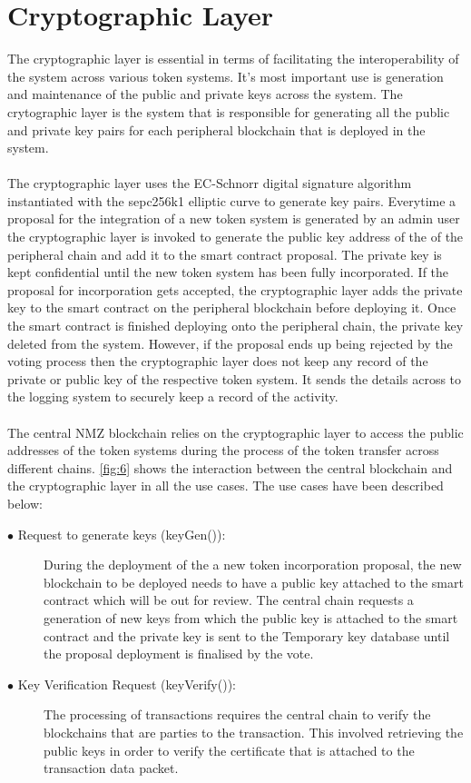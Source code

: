 \documentclass[a4paper,twoside,phd]{BYUPhys}
\begin{document}
\section{Cryptographic Layer}
The cryptographic layer is essential in terms of facilitating the interoperability of the system across various token systems. It's most important use is generation and maintenance of the public and private keys across the system. The crytographic layer is the system that is responsible for generating all the public and private key pairs for each peripheral blockchain that is deployed in the system. 
\\
\\
The cryptographic layer uses the EC-Schnorr digital signature algorithm instantiated with the sepc256k1 elliptic curve to generate key pairs. Everytime a proposal for the integration of a new token system is generated by an admin user the cryptographic layer is invoked to generate the public key address of the of the peripheral chain and add it to the smart contract proposal. The private key is kept confidential until the new token system has been fully incorporated. If the proposal for incorporation gets accepted, the cryptographic layer adds the private key to the smart contract on the peripheral blockchain before deploying it. Once the smart contract is finished deploying onto the peripheral chain, the private key deleted from the system. However, if the proposal ends up being rejected by the voting process then the cryptographic layer does not keep any record of the private or public key of the respective token system. It sends the details across to the logging system to securely keep a record of the activity.
\\
\\
The central NMZ blockchain relies on the cryptographic layer to access the public addresses of the token systems during the process of the token transfer across different chains. \ref{fig:6} shows the interaction between the central blockchain and the cryptographic layer in all the use cases. The use cases have been described below:
\begin{description}
    \item[$\bullet$ Request to generate keys (keyGen()):] During the deployment of the a new token incorporation proposal, the new blockchain to be deployed needs to have a public key attached to the smart contract which will be out for review. The central chain requests a generation of new keys from which the public key is attached to the smart contract and the private key is sent to the Temporary key database until the proposal deployment is finalised by the vote.
    \item[$\bullet$ Key Verification Request (keyVerify()):] The processing of transactions requires the central chain to verify the blockchains that are parties to the transaction. This involved retrieving the public keys in order to verify the certificate that is attached to the transaction data packet.
\end{description}
\end{document}
